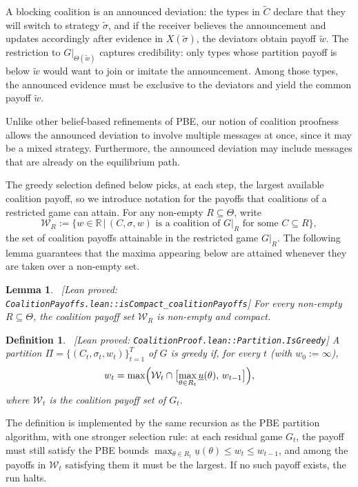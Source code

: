 \documentclass[11pt]{article}
\newtheorem{lemma}{Lemma}
\newtheorem{definition}{Definition}
\newcommand{\sep}{\,|\,}
\newcommand{\W}{\mathcal{W}}
\newcommand{\leanproved}[1]{{\footnotesize\textsf{\textcolor{green!55!black}{[Lean proved: \texttt{#1}]}}}}
\begin{document}
A blocking coalition is an announced deviation: the types in $\widetilde C$ declare that they will switch to strategy $\widetilde\sigma$, and if the receiver believes the announcement and updates accordingly after evidence in $X(\widetilde\sigma)$, the deviators obtain payoff $\widetilde w$.
The restriction to $G\vert_{\Theta(\widetilde w)}$ captures credibility: only types whose partition payoff is below $\widetilde w$ would want to join or imitate the announcement.
Among those types, the announced evidence must be exclusive to the deviators and yield the common payoff $\widetilde w$.

Unlike other belief-based refinements of PBE, our notion of coalition proofness allows the announced deviation to involve multiple messages at once, since it may be a mixed strategy. Furthermore, the announced deviation may include messages that are already on the equilibrium path.

The greedy selection defined below picks, at each step, the largest available coalition payoff, so we introduce notation for the payoffs that coalitions of a restricted game can attain. For any non-empty $R\subseteq\Theta$, write
\[
    \W_R
    :=
    \{w\in\mathbb{R}\sep
    (C,\sigma,w)\text{ is a coalition of }G\vert_R
    \text{ for some }C\subseteq R\},
\]
the set of coalition payoffs attainable in the restricted game $G\vert_R$. The following lemma guarantees that the maxima appearing below are attained whenever they are taken over a non-empty set.

\begin{lemma}\label{lem:coalition-compact}\ \leanproved{CoalitionPayoffs.lean::isCompact\_coalitionPayoffs}
    For every non-empty $R\subseteq\Theta$, the coalition payoff set $\W_R$ is non-empty and compact.
\end{lemma}

\begin{definition}\label{dfn:greedy}\ \leanproved{CoalitionProof.lean::Partition.IsGreedy}
    A partition $\Pi=\{(C_t,\sigma_t,w_t)\}_{t=1}^T$ of $G$ is
    \emph{greedy} if, for every $t$ (with $w_0:=\infty$),
    \[
        w_t
        =
        \max\Bigl(
        \W_t
        \cap
        \bigl[\max_{\theta\in R_t}\underline{u}(\theta),\,
        w_{t-1}\bigr]
        \Bigr),
    \]
    where $\W_t$ is the coalition payoff set of $G_t$.
\end{definition}

The definition is implemented by the same recursion as the PBE partition algorithm, with one stronger selection rule: at each residual game $G_t$, the payoff must still satisfy the PBE bounds $\max_{\theta\in R_t}\underline{u}(\theta)\leq w_t\leq w_{t-1}$, and among the payoffs in $\W_t$ satisfying them it must be the largest. If no such payoff exists, the run halts.
\end{document}
